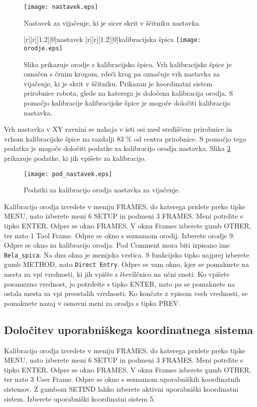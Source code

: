 \begin{figure}[!hbt]
	\centering
	\texttt{[image: nastavek.eps]}
	\caption{Nastavek za vijačenje, ki je sicer skrit v ščitniku nastavka.}
	\label{fig:nastavek}
\end{figure}

\begin{figure}[!hbt]
	\centering
	[r][1.2][0]{nastavek}
	[r][1.2][0]{kalibracijska špica}
	\texttt{[image: orodje.eps]}
	\caption{Slika prikazuje orodje s kalibracijsko špico. Vrh kalibracijske špice je označen s črnim krogom, rdeči krog pa označuje vrh nastavka za vijačenje, ki je skrit v ščitniku. Prikazan je koordinatni sistem prirobnice robota, glede na katerega je določena kalibracija orodja. S pomočjo kalibracije kalibracijske špice je mogoče določiti kalibracijo nastavka.}
	\label{fig:orodje}
\end{figure}

Vrh nastavka v XY ravnini se nahaja v isti osi med središčem prirobnice in vrhom kalibracijske špice na razdalji 83 \% od centra prirobnice. S pomočjo tega podatka je mogoče določiti podatke za kalibracijo orodja nastavka. Slika \ref{fig:pod_nastavek} prikazuje podatke, ki jih vpišete za kalibracijo. 

\begin{figure}[!hbt]
	\centering
	\texttt{[image: pod\_nastavek.eps]}
	\caption{Podatki za kalibracijo orodja nastavka za vijačenje.}
	\label{fig:pod_nastavek}
\end{figure}

Kalibracijo orodja izvedete v meniju FRAMES, do katerega pridete preko tipke MENU, nato izberete meni 6 SETUP in podmeni 3 FRAMES. Meni potrdite s tipko ENTER. Odpre se okno FRAMES. V oknu Frames izberete gumb OTHER, ter nato 1 Tool Frame. Odpre se okno s seznamom orodij. Izberete orodje 9. Odpre se okno za kalibracijo orodja. Pod Comment mora biti izpisano ime \verb|Bela_spica|. Na dnu okna je menijska vrstica. S funkcijsko tipko najprej izberete gumb METHOD, nato \verb|Direct Entry|. Odpre se vam okno, kjer se pomaknete na mesta za vpi vrednosti, ki jih vpište s številčnico na učni enoti. Ko vpišete posamezno vrednost, jo potrdeite s tipko ENTER, nato pa se pomaknete na ostala mesta za vpi preostalih vrednosti. Ko končate z vpisom vseh vrednosti, se pomaknete nazaj v osnovni meni za orodja s tipko PREV.

\newpage

\subsection{Določitev uporabniškega koordinatnega sistema}
Kalibracijo orodja izvedete v meniju FRAMES, do katerega pridete preko tipke MENU, nato izberete meni 6 SETUP in podmeni 3 FRAMES. Meni potrdite s tipko ENTER. Odpre se okno FRAMES. V oknu Frames izberete gumb OTHER, ter nato 3 User Frame. Odpre se okno s seznamom uporabniških koordinatnih sistemov. Z gumbom SETIND lahko izberete aktivni uporabniški koordinatni sistem. Izberete uporabniški koordinatni sistem 5.
 
